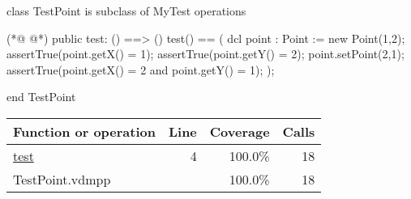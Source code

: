 \begin{vdmpp}[breaklines=true]
class TestPoint is subclass of MyTest
operations

(*@
\label{test:4}
@*)
 public test: () ==> ()
 test() ==
 (
  dcl point : Point := new Point(1,2);
  assertTrue(point.getX() = 1);
  assertTrue(point.getY() = 2);
  point.setPoint(2,1);
  assertTrue(point.getX() = 2 and point.getY() = 1);
 );


end TestPoint
\end{vdmpp}
\bigskip
\begin{longtable}{|l|r|r|r|}
\hline
Function or operation & Line & Coverage & Calls \\
\hline
\hline
\hyperref[test:4]{test} & 4&100.0\% & 18 \\
\hline
\hline
TestPoint.vdmpp & & 100.0\% & 18 \\
\hline
\end{longtable}

